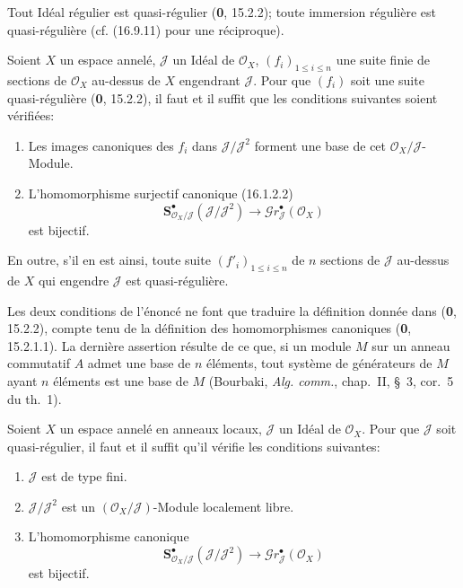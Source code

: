 Tout Idéal régulier est quasi-régulier (\textbf{0}, 15.2.2); toute immersion régulière
est quasi-régulière (cf. (16.9.11) pour une réciproque).

\begin{proposition}[16.9.3]
\label{IV.16.9.3}
Soient $X$ un espace annelé, $\mathscr{J}$ un Idéal de $\mathcal{O}_X$,
$(f_i)_{1\leq i\leq n}$ une suite finie de sections de $\mathcal{O}_X$
au-dessus de $X$ engendrant $\mathscr{J}$. Pour que $(f_i)$ soit une suite
quasi-régulière \textup{(\textbf{0}, 15.2.2)}, il faut et il suffit que les conditions suivantes
soient vérifiées:
\begin{enumerate}
  \item[\textup{(i)}] Les images canoniques des $f_i$ dans
  $\mathscr{J}/\mathscr{J}^2$ forment une base de cet
  $\mathcal{O}_X/\mathscr{J}$-Module.
  \item[\textup{(ii)}] L'homomorphisme surjectif canonique \textup{(16.1.2.2)}
  \[
    \mathbf{S}_{\mathcal{O}_X/\mathscr{J}}^{\bullet}
    (\mathscr{J}/\mathscr{J}^2)
    \longrightarrow\mathscr{G}r_{\mathscr{J}}^{\bullet}(\mathcal{O}_X)
  \]
  est bijectif.
\end{enumerate}

En outre, s'il en est ainsi, toute suite $(f'_i)_{1\leq i\leq n}$ de $n$
sections de $\mathscr{J}$ au-dessus de $X$ qui engendre $\mathscr{J}$ est
quasi-régulière.
\end{proposition}


Les deux conditions de l'énoncé ne font que traduire la définition donnée dans
(\textbf{0}, 15.2.2), compte tenu de la définition des homomorphismes canoniques
(\textbf{0}, 15.2.1.1). La dernière assertion résulte de ce que, si un module $M$ sur
un anneau commutatif $A$ admet une base de $n$ éléments, tout système de
générateurs de $M$ ayant $n$ éléments est une base de $M$ (Bourbaki,
\emph{Alg. comm.}, chap.~II, §~3, cor.~5 du th.~1).

\begin{corollary}[16.9.4]
\label{IV.16.9.4}
Soient $X$ un espace annelé en anneaux locaux, $\mathscr{J}$ un Idéal de
$\mathcal{O}_X$. Pour que $\mathscr{J}$ soit quasi-régulier, il faut et il
suffit qu'il vérifie les conditions suivantes:
\begin{enumerate}
  \item[\textup{(i)}] $\mathscr{J}$ est de type fini.
  \item[\textup{(ii)}] $\mathscr{J}/\mathscr{J}^2$ est un
  $(\mathcal{O}_X/\mathscr{J})$-Module localement libre.
  \item[\textup{(iii)}] L'homomorphisme canonique
  \[
    \mathbf{S}_{\mathcal{O}_X/\mathscr{J}}^{\bullet}
    (\mathscr{J}/\mathscr{J}^2)
    \longrightarrow\mathscr{G}r_{\mathscr{J}}^{\bullet}(\mathcal{O}_X)
    \tag{16.9.4.1}
    \label{IV.16.9.4.1}
  \]
  est bijectif.
\end{enumerate}
\end{corollary}

